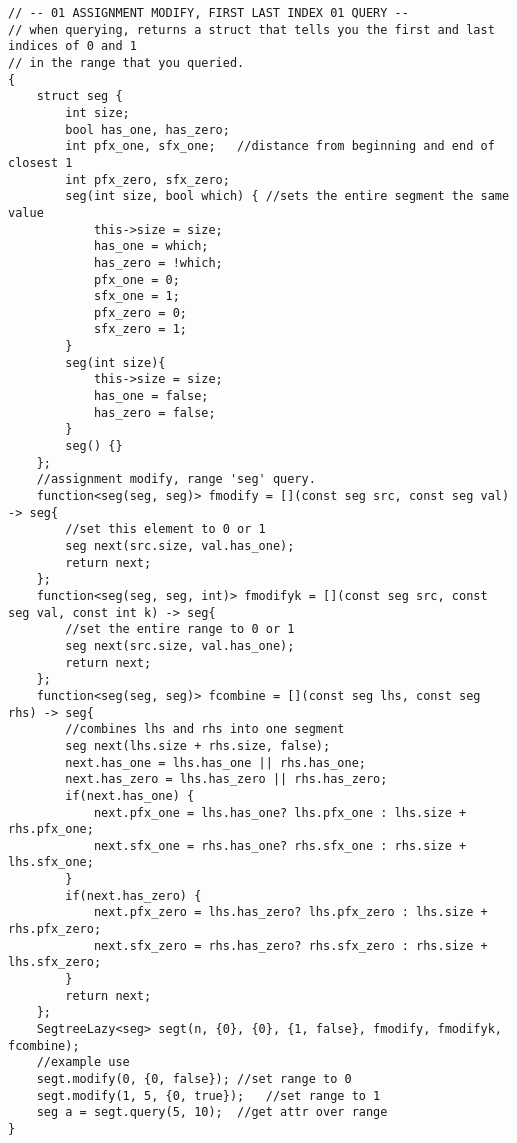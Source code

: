 \documentclass[8pt, headheight=10pt, a4paper]{article}
\begin{document}
\begin{multicols*}{3}
\begin{lstlisting}
// -- 01 ASSIGNMENT MODIFY, FIRST LAST INDEX 01 QUERY -- 
// when querying, returns a struct that tells you the first and last indices of 0 and 1
// in the range that you queried. 
{
    struct seg {
        int size;
        bool has_one, has_zero;
        int pfx_one, sfx_one;   //distance from beginning and end of closest 1
        int pfx_zero, sfx_zero; 
        seg(int size, bool which) { //sets the entire segment the same value
            this->size = size;
            has_one = which;
            has_zero = !which;
            pfx_one = 0;
            sfx_one = 1;
            pfx_zero = 0;
            sfx_zero = 1;
        }
        seg(int size){
            this->size = size;
            has_one = false;
            has_zero = false;
        }
        seg() {}
    };
    //assignment modify, range 'seg' query. 
    function<seg(seg, seg)> fmodify = [](const seg src, const seg val) -> seg{
        //set this element to 0 or 1
        seg next(src.size, val.has_one);
        return next;
    };
    function<seg(seg, seg, int)> fmodifyk = [](const seg src, const seg val, const int k) -> seg{
        //set the entire range to 0 or 1
        seg next(src.size, val.has_one);
        return next;
    };
    function<seg(seg, seg)> fcombine = [](const seg lhs, const seg rhs) -> seg{
        //combines lhs and rhs into one segment
        seg next(lhs.size + rhs.size, false);
        next.has_one = lhs.has_one || rhs.has_one;
        next.has_zero = lhs.has_zero || rhs.has_zero;
        if(next.has_one) {
            next.pfx_one = lhs.has_one? lhs.pfx_one : lhs.size + rhs.pfx_one;
            next.sfx_one = rhs.has_one? rhs.sfx_one : rhs.size + lhs.sfx_one;
        }
        if(next.has_zero) {
            next.pfx_zero = lhs.has_zero? lhs.pfx_zero : lhs.size + rhs.pfx_zero;
            next.sfx_zero = rhs.has_zero? rhs.sfx_zero : rhs.size + lhs.sfx_zero;
        }
        return next;
    };
    SegtreeLazy<seg> segt(n, {0}, {0}, {1, false}, fmodify, fmodifyk, fcombine);
    //example use
    segt.modify(0, {0, false}); //set range to 0
    segt.modify(1, 5, {0, true});   //set range to 1
    seg a = segt.query(5, 10);  //get attr over range
}
\end{lstlisting}


\end{multicols*}
\end{document}
